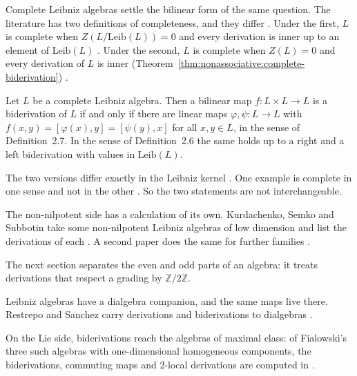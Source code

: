 Complete Leibniz algebras settle the bilinear form of the same question. The
literature has two definitions of completeness, and they differ
\cite[Definitions~2.6--2.7, p.~6]{DiBartoloDiFattaLaRosa2025Leibniz}. Under the
first, $L$ is complete when $Z(L/\mathrm{Leib}(L))=0$ and every derivation is
inner up to an element of $\mathrm{Leib}(L)$
\cite[Definition~2.6, p.~6]{DiBartoloDiFattaLaRosa2025Leibniz}. Under the
second, $L$ is complete when $Z(L)=0$ and every derivation of $L$ is inner (Theorem~\ref{thm:nonassociative:complete-biderivation})
\cite[Definition~2.7, p.~6]{DiBartoloDiFattaLaRosa2025Leibniz}.\begin{theorem}\label{thm:nonassociative:complete-biderivation}
Let $L$ be a complete Leibniz algebra. Then a bilinear map $f\colon L\times
L\to L$ is a biderivation of $L$ if and only if there are linear maps
$\varphi,\psi\colon L\to L$ with $f(x,y)=[\varphi(x),y]=[\psi(y),x]$ for all
$x,y\in L$, in the sense of Definition~2.7. In the sense of Definition~2.6 the
same holds up to a right and a left biderivation with values in
$\mathrm{Leib}(L)$.
\end{theorem}

The two versions differ exactly in the Leibniz kernel
\cite[pp.~7--8]{DiBartoloDiFattaLaRosa2025Leibniz}. One example is complete in
one sense and not in the other \cite[Example~2.7.1, p.~6]{DiBartoloDiFattaLaRosa2025Leibniz}.
So the two statements are not interchangeable.

The non-nilpotent side has a calculation of its own. Kurdachenko, Semko and
Subbotin take some non-nilpotent Leibniz algebras of low dimension and list the
derivations of each \cite[Theorems~1--3, pp.~120--126]{KurdachenkoSemkoSubbotin2025}.
A second paper does the same for further families
\cite[Theorems~1--2, pp.~209--211]{KurdachenkoSemkoSubbotin2025b}.

The next section separates the even and odd parts of an algebra: %
it treats derivations that respect a grading by
$\mathbb{Z}/2\mathbb{Z}$.

Leibniz algebras have a dialgebra companion, and the same maps live there.
Restrepo and Sanchez carry derivations and biderivations to dialgebras
\cite[Abstract]{RestrepoSanchezDialgebras2026}.

On the Lie side, biderivations reach the algebras of maximal class: of
Fialowski's three such algebras with one-dimensional homogeneous components,
the biderivations, commuting maps and 2-local derivations are computed in
\cite[Abstract]{BiderivationsCommuting2Local2024}.

